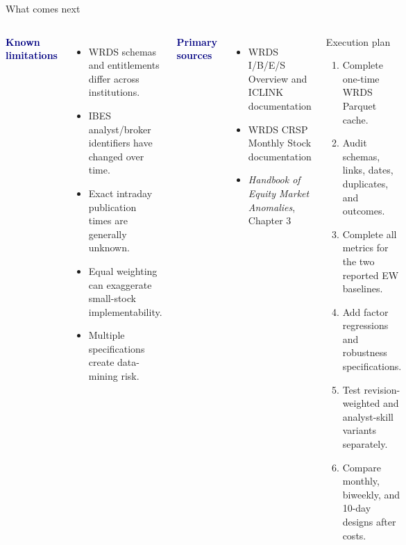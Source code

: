 \documentclass[aspectratio=169,10pt]{beamer}
\newcommand{\smallhead}[1]{\textcolor{navy}{\textbf{#1}}}
\begin{document}
\begin{frame}[shrink=12]{What comes next}
\begin{columns}[T,onlytextwidth]
\smallhead{Known limitations}
\begin{itemize}\setlength\itemsep{0.28em}
  \item WRDS schemas and entitlements differ across institutions.
  \item IBES analyst/broker identifiers have changed over time.
  \item Exact intraday publication times are generally unknown.
  \item Equal weighting can exaggerate small-stock implementability.
  \item Multiple specifications create data-mining risk.
\end{itemize}
\smallhead{Primary sources}
\begin{itemize}\setlength\itemsep{0.22em}\footnotesize
  \item WRDS I/B/E/S Overview and ICLINK documentation
  \item WRDS CRSP Monthly Stock documentation
  \item \emph{Handbook of Equity Market Anomalies}, Chapter 3
\end{itemize}
\begin{block}{Execution plan}
\begin{enumerate}\setlength\itemsep{0.35em}
  \item Complete one-time WRDS Parquet cache.
  \item Audit schemas, links, dates, duplicates, and outcomes.
  \item Complete all metrics for the two reported EW baselines.
  \item Add factor regressions and robustness specifications.
  \item Test revision-weighted and analyst-skill variants separately.
  \item Compare monthly, biweekly, and 10-day designs after costs.
\end{enumerate}
\end{block}
\end{columns}
\end{frame}
\end{document}
